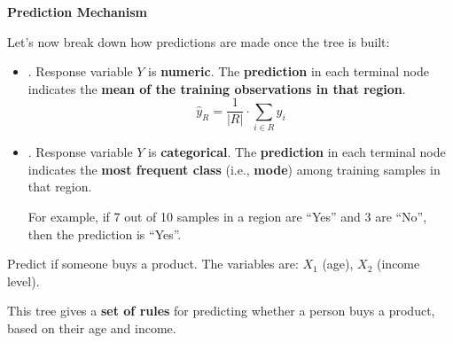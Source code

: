\highspace
\begin{flushleft}
    \textcolor{Green3}{ \textbf{Prediction Mechanism}}
\end{flushleft}
Let's now break down how predictions are made once the tree is built:
\begin{itemize}
    \item {}. Response variable $Y$ is \textbf{numeric}. The \textbf{prediction} in each terminal node indicates the \textbf{mean of the training observations in that region}.
    \begin{equation*}
        \hat{y}_R = \dfrac{1}{\left|R\right|} \cdot \displaystyle\sum_{i \in R} y_i
    \end{equation*}
    \item {}. Response variable $Y$ is \textbf{categorical}. The \textbf{prediction} in each terminal node indicates the \textbf{most frequent class} (i.e., \textbf{mode}) among training samples in that region.

    For example, if 7 out of 10 samples in a region are ``Yes'' and 3 are ``No'', then the prediction is ``Yes''.
\end{itemize}

\begin{examplebox}
    Predict if someone buys a product. The variables are: $X_1$ (age), $X_2$ (income level).
    \begin{center}
    \end{center}

    This tree gives a \textbf{set of rules} for predicting whether a person buys a product, based on their age and income.
\end{examplebox}

